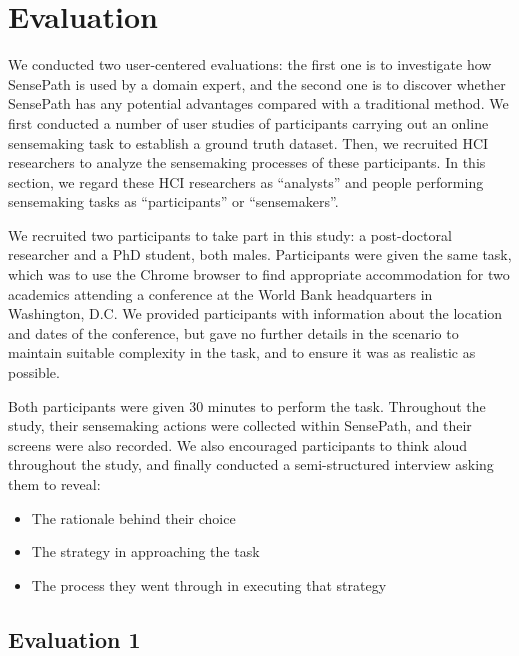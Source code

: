 \section{Evaluation}
We conducted two user-centered evaluations: the first one is to investigate how SensePath is used by a domain expert, and the second one is to discover whether SensePath has any potential advantages compared with a traditional method. We first conducted a number of user studies of participants carrying out an online sensemaking task to establish a ground truth dataset. Then, we recruited HCI researchers to analyze the sensemaking processes of these participants. In this section, we regard these HCI researchers as ``analysts'' and people performing sensemaking tasks as ``participants'' or ``sensemakers''.

We recruited two participants to take part in this study: a post-doctoral researcher and a PhD student, both males. Participants were given the same task, which was to use the Chrome browser to find appropriate accommodation for two academics attending a conference at the World Bank headquarters in Washington, D.C. We provided participants with information about the location and dates of the conference, but gave no further details in the scenario to maintain suitable complexity in the task, and to ensure it was as realistic as possible.

Both participants were given 30 minutes to perform the task. Throughout the study, their sensemaking actions were collected within SensePath, and their screens were also recorded. We also encouraged participants to think aloud throughout the study, and finally conducted a semi-structured interview asking them to reveal:

\begin{itemize}
	\item The rationale behind their choice
	\item The strategy in approaching the task
	\item The process they went through in executing that strategy
\end{itemize}

\pagebreak

\subsection{Evaluation 1}

